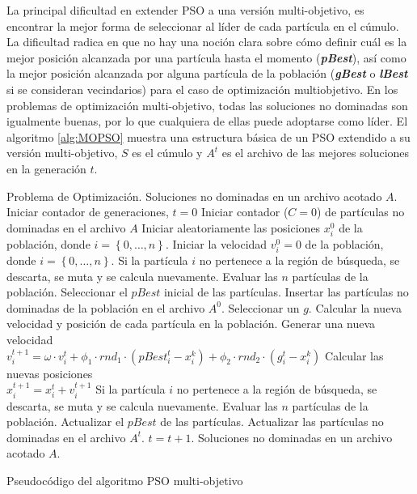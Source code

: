   La principal dificultad en extender PSO a una versi\'on multi-objetivo, es encontrar la mejor forma de seleccionar 
  al l\'ider de cada part\'icula en el c\'umulo. La dificultad radica en que no hay una noci\'on clara sobre c\'omo definir
  cu\'al es la mejor posici\'on alcanzada por una part\'icula hasta el momento (\textbf{\textit{pBest}}), as\'i como la mejor 
  posici\'on alcanzada por alguna part\'icula de la poblaci\'on (\textbf{\textit{gBest}} o \textbf{\textit{lBest}} si se consideran 
  vecindarios) para el caso de optimizaci\'on multiobjetivo. En los problemas de optimizaci\'on multi-objetivo, todas las soluciones 
  no dominadas son igualmente buenas, por lo que cualquiera de ellas puede adoptarse como l\'ider.  El algoritmo \ref{alg:MOPSO} 
  muestra una estructura b\'asica de un PSO extendido a su versi\'on multi-objetivo, $S$ es el c\'umulo y $A^t$ es el archivo de las 
  mejores soluciones en la generaci\'on $t$.

  \begin{algorithm}
  \begin{algorithmic}[1]
	\REQUIRE Problema de Optimizaci\'on.
	\ENSURE Soluciones no dominadas en un archivo acotado $A$.
		\STATE Iniciar contador de generaciones, $t=0$
		\STATE Iniciar contador ($C=0$) de part\'iculas no dominadas en el archivo $A$
		\STATE Iniciar aleatoriamente las posiciones $x^{0}_{i}$ de la poblaci\'on, donde $i=\left\{0,\ldots,n\right\}$.		
		\STATE Iniciar la velocidad $v^{0}_{i} = 0$ de la poblaci\'on, donde $i=\left\{0,\ldots,n\right\}$.
		\STATE Si la part\'icula $i$ no pertenece a la regi\'on de b\'usqueda, se descarta, se muta y se calcula nuevamente.	 
		\STATE Evaluar las $n$ part\'iculas de la poblaci\'on.
		\STATE Seleccionar el $pBest$ inicial de las part\'iculas.  
		\STATE Insertar las part\'iculas no dominadas de la poblaci\'on en el archivo $A^{0}$.
			\STATE Seleccionar un $g$.
			\STATE Calcular la nueva velocidad y posici\'on de cada part\'icula en la poblaci\'on.
			    \STATE Generar una nueva velocidad 
			      \\ $v^{t+1}_{i}=\omega\cdot v^{t}_{i}+\phi_{1}\cdot rnd_{1} \cdot \left(pBest^{t}_{i}-x^{k}_{i}\right) 
			      +\phi_{2}\cdot rnd_{2} \cdot \left(g^{t}_{i}-x^{k}_{i}\right)$
			    \STATE Calcular las nuevas posiciones 
				\\$x^{t+1}_{i}=x^{t}_{i}+v^{t+1}_{i}$
			    \ENDFOR
			\STATE Si la part\'icula $i$ no pertenece a la regi\'on de b\'usqueda, se descarta, se muta y se calcula nuevamente.
			\STATE Evaluar las $n$ part\'iculas de la poblaci\'on.	
			\STATE Actualizar el $pBest$ de las part\'iculas.  
			\STATE Actualizar las part\'iculas no dominadas en el archivo $A^{t}$.
			\STATE $t=t+1$.
	\ENDWHILE
	\RETURN Soluciones no dominadas en un archivo acotado $A$.
	\end{algorithmic}
	\caption{Pseudoc\'odigo del algoritmo PSO multi-objetivo}
	\label{alg:MOPSO}
	\end{algorithm}

